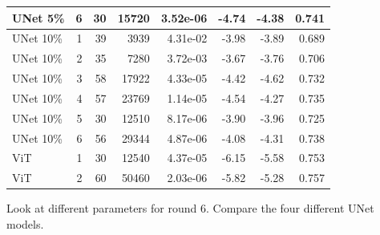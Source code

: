 \begin{table}
\begin{tabular}{lrrrrrrr}
UNet 5\% & 6 & 30 & 15720 & 3.52e-06 & -4.74 & -4.38 & 0.741 \\
\midrule
UNet 10\% & 1 & 39 & 3939 & 4.31e-02 & -3.98 & -3.89 & 0.689 \\
UNet 10\% & 2 & 35 & 7280 & 3.72e-03 & -3.67 & -3.76 & 0.706 \\
UNet 10\% & 3 & 58 & 17922 & 4.33e-05 & -4.42 & -4.62 & 0.732 \\
UNet 10\% & 4 & 57 & 23769 & 1.14e-05 & -4.54 & -4.27 & 0.735 \\
UNet 10\% & 5 & 30 & 12510 & 8.17e-06 & -3.90 & -3.96 & 0.725 \\
UNet 10\% & 6 & 56 & 29344 & 4.87e-06 & -4.08 & -4.31 & 0.738 \\
\midrule
ViT & 1 & 30 & 12540 & 4.37e-05 & -6.15 & -5.58 & 0.753 \\
ViT & 2 & 60 & 50460 & 2.03e-06 & -5.82 & -5.28 & 0.757 \\
\bottomrule
\end{tabular}
\end{table}


Look at different parameters for round 6.
Compare the four different UNet models.


